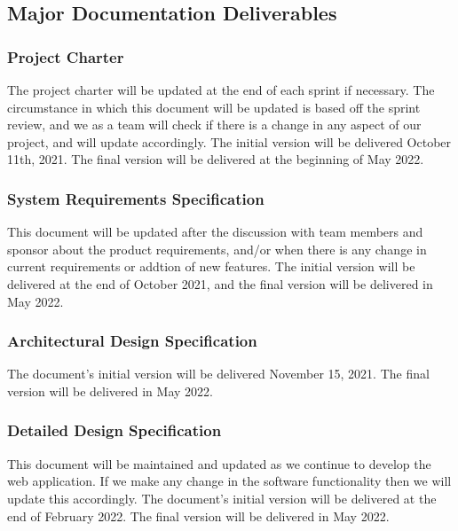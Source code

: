 
\subsection{Major Documentation Deliverables}

\subsubsection{Project Charter}
The project charter will be updated at the end of each sprint if necessary. The circumstance in which this document will be updated is based off the sprint review, and we as a team will check if there is a change in any aspect of our project, and will update accordingly. The initial version will be delivered October 11th, 2021. The final version will be delivered at the beginning of May 2022.

\subsubsection{System Requirements Specification}
This document will be updated after the discussion with team members and sponsor about the product requirements, and/or when there is any change in current requirements or addtion of new features. The initial version will be delivered at the end of October 2021, and the final version will be delivered in May 2022.

\subsubsection{Architectural Design Specification}
The document's initial version will be delivered November 15, 2021. The final version will be delivered in May 2022.

\subsubsection{Detailed Design Specification}
This document will be maintained and updated as we continue to develop the web application. If we make any change in the software functionality then we will update this accordingly. The document's initial version will be delivered at the end of February 2022. The final version will be delivered in May 2022. 

